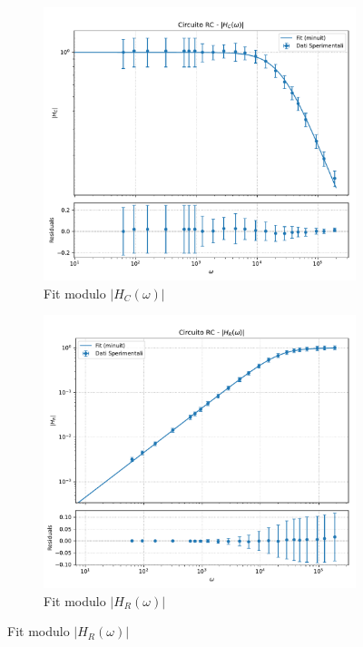 \documentclass[a4paper]{article}
\begin{document}
\begin{figure}[htbp]
    \centering

    \begin{subfigure}[b]{0.495\textwidth}
        \centering
        \includegraphics[width=\linewidth]{grafici/rc_hc.pdf}
        \caption{Fit modulo $|H_C(\omega)|$}
        \label{fig:rc_hc}
    \end{subfigure}
    \hfill
    \begin{subfigure}[b]{0.495\textwidth}
        \centering
        \includegraphics[width=\linewidth]{grafici/rc_hr.pdf}
        \caption{Fit modulo $|H_R(\omega)|$}
        \label{fig:rc_hr}
    \end{subfigure}


\end{figure}
\end{document}
